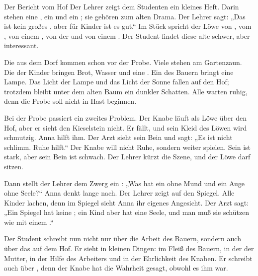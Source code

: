 \documentclass[12pt]{nextbook}
\begin{document}
\begin{readersection}{Der Bericht vom Hof}
Der Lehrer zeigt dem Studenten ein kleines Heft. Darin stehen eine  , ein  und ein ; sie gehören zum alten Drama. Der Lehrer sagt: „Das ist kein großes , aber für Kinder ist es gut.“ Im Stück spricht der Löwe von , vom , von einem , von der  und von einem . Der Student findet diese alte  schwer, aber interessant.

Die  aus dem Dorf kommen schon vor der Probe. Viele  stehen am Gartenzaun. Die  der Kinder bringen Brot, Wasser und eine . Ein  des Bauern bringt eine Lampe. Das Licht der Lampe und das Licht der Sonne fallen auf den Hof; trotzdem bleibt unter dem alten Baum ein dunkler Schatten. Alle warten ruhig, denn die Probe soll nicht in Hast beginnen.

Bei der Probe passiert ein zweites Problem. Der Knabe läuft als Löwe über den Hof, aber er sieht den Kieselstein nicht. Er fällt, und sein Kleid des Löwen wird schmutzig. Anna hilft ihm. Der Arzt sieht sein Bein und sagt: „Es ist nicht schlimm. Ruhe hilft.“ Der Knabe will nicht Ruhe, sondern weiter spielen. Sein  ist stark, aber sein Bein ist schwach. Der Lehrer kürzt die Szene, und der Löwe darf sitzen.

Dann stellt der Lehrer dem Zwerg ein : „Was hat ein  ohne Mund und ein Auge ohne Seele?“ Anna denkt lange nach. Der Lehrer zeigt auf den Spiegel. Alle Kinder lachen, denn im Spiegel sieht Anna ihr eigenes Angesicht. Der Arzt sagt: „Ein Spiegel hat keine ; ein Kind aber hat eine Seele, und man muß sie schützen wie mit einem .“

Der Student schreibt nun nicht nur über die Arbeit des Bauern, sondern auch über das  auf dem Hof. Er sieht  in kleinen Dingen: im Fleiß des Bauern, in der  der Mutter, in der Hilfe des Arbeiters und in der Ehrlichkeit des Knaben. Er schreibt auch über , denn der Knabe hat die Wahrheit gesagt, obwohl es ihm  war.


\end{readersection}
\end{document}
